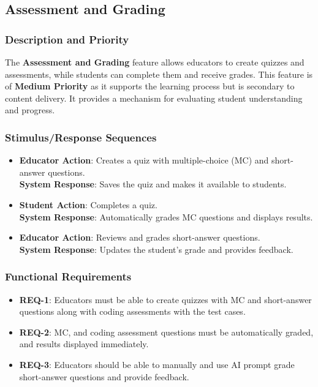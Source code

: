 \documentclass[a4paper, 11pt]{scrreprt}
\begin{document}
\subsection{Assessment and Grading}
\subsubsection{Description and Priority}
The \textbf{Assessment and Grading} feature allows educators to create quizzes and assessments, while students can complete them and receive grades. This feature is of \textbf{Medium Priority} as it supports the learning process but is secondary to content delivery. It provides a mechanism for evaluating student understanding and progress.

\subsubsection{Stimulus/Response Sequences}
\begin{itemize}
    \item \textbf{Educator Action}: Creates a quiz with multiple-choice (MC) and short-answer questions. \\
          \textbf{System Response}: Saves the quiz and makes it available to students.
    \item \textbf{Student Action}: Completes a quiz. \\
          \textbf{System Response}: Automatically grades MC questions and displays results.
    \item \textbf{Educator Action}: Reviews and grades short-answer questions. \\
          \textbf{System Response}: Updates the student's grade and provides feedback.
\end{itemize}

\subsubsection{Functional Requirements}
    \begin{itemize}
    \item \textbf{REQ-1}: Educators must be able to create quizzes with MC and short-answer questions along with coding assessments with the test cases.
    \item \textbf{REQ-2}: MC, and coding assessment questions must be automatically graded, and results displayed immediately.
    \item \textbf{REQ-3}: Educators should be able to manually and use AI prompt grade short-answer questions and provide feedback.
\end{itemize}
\end{document}
